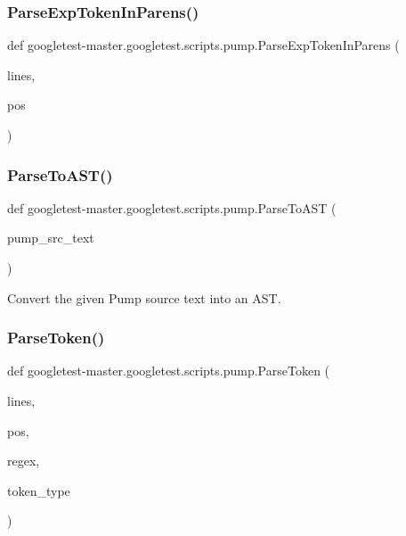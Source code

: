 \subsubsection{\texorpdfstring{ParseExpTokenInParens()}{ParseExpTokenInParens()}}
{\footnotesize\ttfamily def googletest-\/master.\+googletest.\+scripts.\+pump.\+Parse\+Exp\+Token\+In\+Parens (\begin{DoxyParamCaption}\item[{}]{lines,  }\item[{}]{pos }\end{DoxyParamCaption})}

\mbox{\label{namespacegoogletest-master_1_1googletest_1_1scripts_1_1pump_a41cfeb42e479045ccae88f1253dc7f09}} 
\subsubsection{\texorpdfstring{ParseToAST()}{ParseToAST()}}
{\footnotesize\ttfamily def googletest-\/master.\+googletest.\+scripts.\+pump.\+Parse\+To\+A\+ST (\begin{DoxyParamCaption}\item[{}]{pump\+\_\+src\+\_\+text }\end{DoxyParamCaption})}

\begin{DoxyVerb}Convert the given Pump source text into an AST.\end{DoxyVerb}
 \mbox{\label{namespacegoogletest-master_1_1googletest_1_1scripts_1_1pump_af5d3c06f48dc1fb836a60acc09fd30c6}} 
\subsubsection{\texorpdfstring{ParseToken()}{ParseToken()}}
{\footnotesize\ttfamily def googletest-\/master.\+googletest.\+scripts.\+pump.\+Parse\+Token (\begin{DoxyParamCaption}\item[{}]{lines,  }\item[{}]{pos,  }\item[{}]{regex,  }\item[{}]{token\+\_\+type }\end{DoxyParamCaption})}


